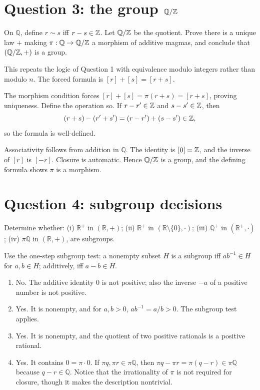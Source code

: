 \documentclass[11pt,openany]{book}
\newcommand{\Q}{\mathbb Q}\newcommand{\R}{\mathbb R}
\begin{document}
\section{Question 3: the group $\Q/\Z$}
\begin{questionbox}
On $\Q$, define $r\sim s$ iff $r-s\in\mathbb Z$. Let $\Q/\Z$ be the quotient. Prove there is a unique law $+$ making $\pi:\Q\to\Q/\Z$ a morphism of additive magmas, and conclude that $(\Q/\Z,+)$ is a group.
\end{questionbox}
\begin{approachbox}
This repeats the logic of Question 1 with equivalence modulo integers rather than modulo $n$. The forced formula is $[r]+[s]=[r+s]$.
\end{approachbox}
\begin{solutionbox}
The morphism condition forces
$[r]+[s]=\pi(r+s)=[r+s]$, proving uniqueness. Define the operation so. If $r-r'\in\mathbb Z$ and $s-s'\in\mathbb Z$, then
\[
(r+s)-(r'+s')=(r-r')+(s-s')\in\mathbb Z,
\]
so the formula is well-defined.

Associativity follows from addition in $\Q$. The identity is $[0]=\mathbb Z$, and the inverse of $[r]$ is $[-r]$. Closure is automatic. Hence $\Q/\Z$ is a group, and the defining formula shows $\pi$ is a morphism.
\end{solutionbox}

\section{Question 4: subgroup decisions}
\begin{questionbox}
Determine whether: (i) $\R^+$ in $(\R,+)$; (ii) $\R^+$ in $(\R\setminus\{0\},\cdot)$; (iii) $\Q^+$ in $(\R^+,\cdot)$; (iv) $\pi\Q$ in $(\R,+)$, are subgroups.
\end{questionbox}
\begin{approachbox}
Use the one-step subgroup test: a nonempty subset $H$ is a subgroup iff $ab^{-1}\in H$ for $a,b\in H$; additively, iff $a-b\in H$.
\end{approachbox}
\begin{solutionbox}
\begin{enumerate}[label=(\roman*)]
\item No. The additive identity $0$ is not positive; also the inverse $-a$ of a positive number is not positive.
\item Yes. It is nonempty, and for $a,b>0$, $ab^{-1}=a/b>0$. The subgroup test applies.
\item Yes. It is nonempty, and the quotient of two positive rationals is a positive rational.
\item Yes. It contains $0=\pi\cdot0$. If $\pi q,\pi r\in\pi\Q$, then
$\pi q-\pi r=\pi(q-r)\in\pi\Q$ because $q-r\in\Q$. Notice that the irrationality of $\pi$ is not required for closure, though it makes the description nontrivial.
\end{enumerate}
\end{solutionbox}
\end{document}
